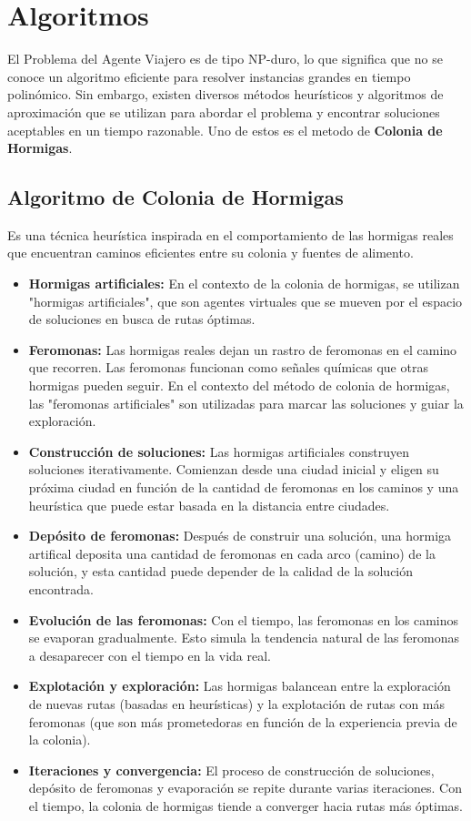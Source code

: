 \documentclass[]{report}
\begin{document}
	\section{Algoritmos}
	El Problema del Agente Viajero es de tipo NP-duro, lo que significa que no se conoce un algoritmo eficiente para resolver instancias grandes en tiempo polinómico. Sin embargo, existen diversos métodos heurísticos y algoritmos de aproximación que se utilizan para abordar el problema y encontrar soluciones aceptables en un tiempo razonable. Uno de estos es el metodo de \textbf{Colonia de Hormigas}.
	
	\subsection{Algoritmo de Colonia de Hormigas}
	Es una técnica heurística inspirada en el comportamiento de las hormigas reales que encuentran caminos eficientes entre su colonia y fuentes de alimento. 
	
	\begin{itemize}
		\item \textbf{Hormigas artificiales:} En el contexto de la colonia de hormigas, se utilizan "hormigas artificiales", que son agentes virtuales que se mueven por el espacio de soluciones en busca de rutas óptimas.
		\item \textbf{Feromonas:} Las hormigas reales dejan un rastro de feromonas en el camino que recorren. Las feromonas funcionan como señales químicas que otras hormigas pueden seguir. En el contexto del método de colonia de hormigas, las "feromonas artificiales" son utilizadas para marcar las soluciones y guiar la exploración.
		\item \textbf{Construcción de soluciones:} Las hormigas artificiales construyen soluciones iterativamente. Comienzan desde una ciudad inicial y eligen su próxima ciudad en función de la cantidad de feromonas en los caminos y una heurística que puede estar basada en la distancia entre ciudades.
		\item \textbf{Depósito de feromonas:} Después de construir una solución, una hormiga artifical deposita una cantidad de feromonas en cada arco (camino) de la solución, y esta cantidad puede depender de la calidad de la solución encontrada.
		\item \textbf{Evolución de las feromonas:} Con el tiempo, las feromonas en los caminos se evaporan gradualmente. Esto simula la tendencia natural de las feromonas a desaparecer con el tiempo en la vida real.
		\item
		\textbf{Explotación y exploración:} Las hormigas balancean entre la exploración de nuevas rutas (basadas en heurísticas) y la explotación de rutas con más feromonas (que son más prometedoras en función de la experiencia previa de la colonia).
		\item
		\textbf{Iteraciones y convergencia:} El proceso de construcción de soluciones, depósito de feromonas y evaporación se repite durante varias iteraciones. Con el tiempo, la colonia de hormigas tiende a converger hacia rutas más óptimas.
	\end{itemize}	
\end{document}
